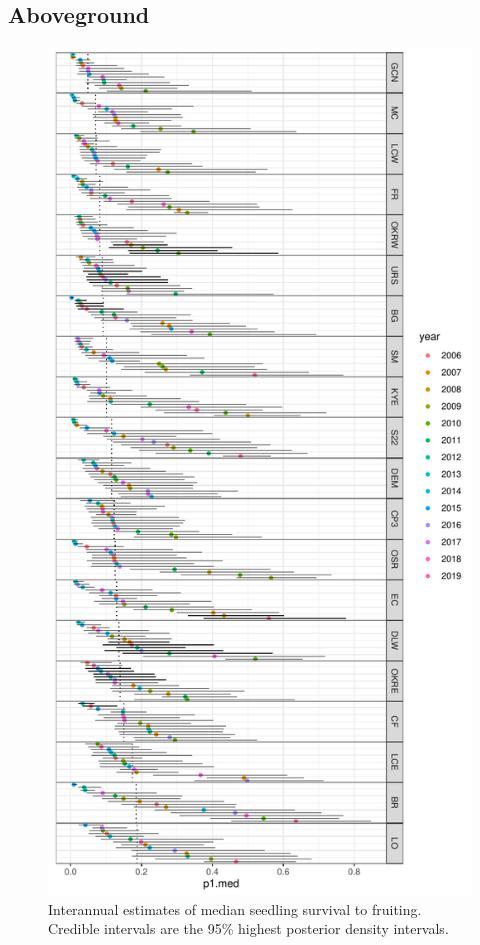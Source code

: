 \documentclass[12pt, oneside]{article}   	%
\begin{document}
\clearpage
\newpage

\subsection*{Aboveground}


 \begin{figure}[!h]
   \centering
       \includegraphics[page=1,height=.95\textheight]{../../figures/interannual-sigma.pdf}  
    \caption{ Interannual estimates of median seedling survival to fruiting. Credible intervals are the 95\% highest posterior density intervals. }
 \label{fig:viability-estimates-population}
\end{figure}
\end{document}
